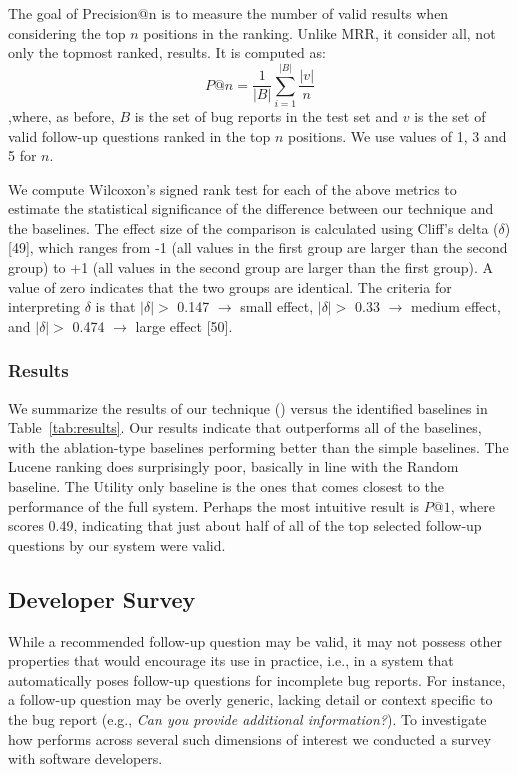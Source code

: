 The goal of Precision@n is to measure the number of valid results when considering the top $n$ positions in the ranking. Unlike MRR, it consider all, not only the topmost ranked, results. It is computed as: $$P@n = \frac{1}{|B|} \sum_{i=1}^{|B|} \frac{|v|}{n}$$ ,where, as before, $B$ is the set of bug reports in the test set and $v$ is the set of valid follow-up questions ranked in the top $n$ positions. We use values of 1, 3 and 5 for $n$.

We compute Wilcoxon's signed rank test for each of the above metrics to estimate the statistical significance of the difference between our technique \evpi and the baselines. The effect size of the comparison is calculated using Cliff's delta ($\delta$) [49], which ranges from -1 (all values in the first group are larger than the second group) to +1 (all values in the second group are larger than the first group). A value of zero indicates that the two groups are identical. The criteria for interpreting $\delta$ is that $|\delta| >$ 0.147 $\rightarrow$ small effect, $|\delta| >$ 0.33 $\rightarrow$ medium effect, and $|\delta| >$ 0.474 $\rightarrow$ large effect [50].


\subsubsection{Results} We summarize the results of our technique (\evpi) versus the identified
baselines in Table~\ref{tab:results}. Our results indicate that \evpi outperforms all of the baselines,
with the ablation-type baselines performing better than the simple baselines. The Lucene ranking
does surprisingly poor, basically in line with the Random baseline. The Utility only baseline is
the ones that comes closest to the performance of the full system. Perhaps the most intuitive result
is $P@1$, where \evpi scores 0.49, indicating that just about half of all of the top selected follow-up
questions by our system were valid.


\subsection{Developer Survey}
While a recommended follow-up question may be valid, it may not possess other properties that would
encourage its use in practice, i.e., in a system that automatically poses follow-up questions for incomplete bug reports. For
instance, a follow-up question may be overly generic, lacking detail or context specific to the bug report (e.g., {\em Can you provide
additional information?}). To investigate how \evpi performs across several such dimensions of interest we conducted a survey with
software developers.

